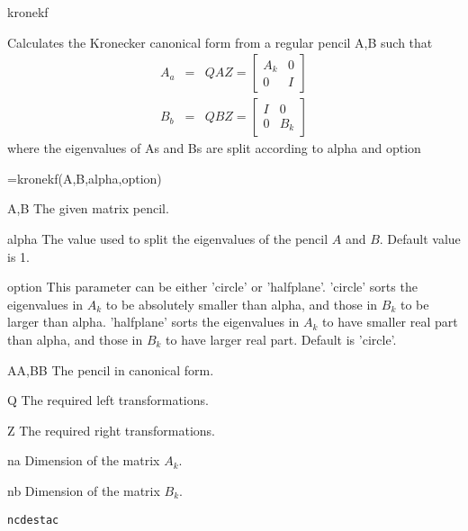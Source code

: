 \documentclass{book}
\newcommand{\mat}[2]{\left[\begin{array}{#1}#2\end{array}\right]}
\newcommand{\ncdestac}{\texttt{ncdestac}} %
\begin{document}
\begin{command}{kronekf}
\begin{purpose}
  Calculates the Kronecker canonical form from a regular pencil A,B
  such that
  \begin{eqnarray*}
    A_a&=&QAZ=\mat{cc}{A_k&0\\ 0& I}\\
    B_b&=&QBZ=\mat{cc}{I&0\\ 0& B_k}
  \end{eqnarray*}
  where the eigenvalues of As and Bs are split according to alpha and option
\end{purpose}
\begin{syntax}
 [AA,BB,Q,Z,na,nb]=kronekf(A,B,alpha,option)
\end{syntax}
\begin{inputs}
\item[A,B] The given matrix pencil.
\item[alpha] The value used to split the eigenvalues of the pencil
  $A$ and $B$. Default value is 1.  
\item[option] This parameter can be either 'circle' or 'halfplane'.
  'circle' sorts the eigenvalues in $A_k$ to be absolutely smaller
  than alpha, and those in $B_k$ to be larger than alpha. 'halfplane'
  sorts the eigenvalues in $A_k$ to have smaller real part than alpha,
  and those in $B_k$ to have larger real part. Default is 'circle'.
\end{inputs}
\begin{outputs}  
\item[AA,BB] The pencil in canonical form.
\item[Q] The required left transformations.
\item[Z] The required right transformations.
\item[na] Dimension of the matrix $A_k$.
\item[nb] Dimension of the matrix $B_k$.
\end{outputs}
\begin{seealso}
{\ncdestac}
\end{seealso}
\end{command}%
\end{document}
